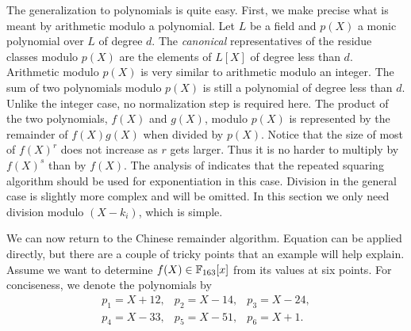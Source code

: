 \medskip
The generalization to polynomials is quite easy.  First, we make
precise what is meant by arithmetic modulo a polynomial.  Let $L$ be a
field and $p(X)$ a monic polynomial over $L$ of degree $d$.  The {\em
canonical} representatives of the residue classes modulo $p(X)$ are
the elements of $L[X]$ of degree less than $d$.  Arithmetic modulo
$p(X)$ is very similar to arithmetic modulo an integer.  The sum of
two polynomials modulo $p(X)$ is still a polynomial of degree less
than $d$.  Unlike the integer case, no normalization step is required
here.  The product of the two polynomials, $f(X)$ and $g(X)$, modulo
$p(X)$ is represented by the remainder of $f(X) g(X)$ when divided by
$p(X)$.  Notice that the size of most of $f(X)^r$ does not increase as 
$r$ gets larger.  Thus it is no harder to multiply by $f(X)^s$ than by 
$f(X)$.  The analysis of  indicates that the 
repeated squaring algorithm should be used for exponentiation in this 
case.  Division in the general case is slightly more complex and will be 
omitted.  In this section we only need division modulo $(X- k_i)$, which 
is simple. 

\smallskip
We can now return to the Chinese remainder algorithm. Equation  can be
applied directly, but there are a couple of tricky points that an
example will help explain.  Assume we want to determine $f(X) \in
\mathbb{F}_{163}[x]$ from its values at six points.  For conciseness, we
denote the polynomials by
\[
\begin{array}{ccc}
p_1 = X + 12, & p_2 = X - 14, & p_3 = X - 24, \\
p_4 = X-33, & p_5 = X - 51, & p_6 = X + 1.
\end{array}
\]

